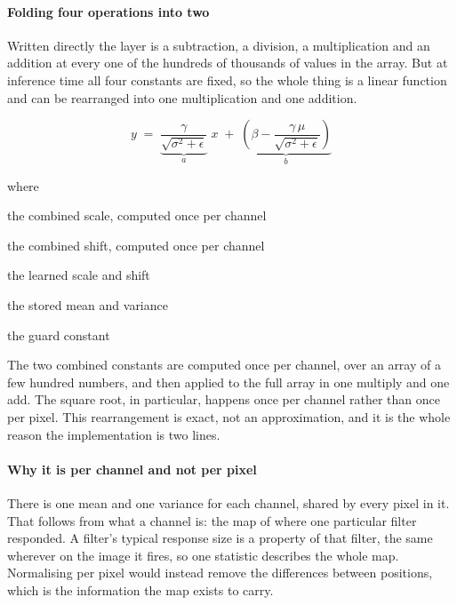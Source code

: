 \paragraph{Folding four operations into two}
Written directly the layer is a subtraction, a division, a multiplication and an addition at every one of the hundreds of thousands of values in the array. But at inference time all four constants are fixed, so the whole thing is a linear function and can be rearranged into one multiplication and one addition.


\begin{equation}
y \;=\; \underbrace{\frac{\gamma}{\sqrt{\sigma^{2}+\epsilon}}}_{\textstyle a} \; x \;+\; \underbrace{\left(\beta - \frac{\gamma\,\mu}{\sqrt{\sigma^{2}+\epsilon}}\right)}_{\textstyle b}
\end{equation}

\noindent where
\begin{description}[leftmargin=2.4em,style=nextline,font=\normalfont\ttfamily]\setlength\itemsep{1pt}
  \item[{$a$}] \normalfont the combined scale, computed once per channel
  \item[{$b$}] \normalfont the combined shift, computed once per channel
  \item[{$\gamma,\,\beta$}] \normalfont the learned scale and shift
  \item[{$\mu,\,\sigma^{2}$}] \normalfont the stored mean and variance
  \item[{$\epsilon$}] \normalfont the guard constant
\end{description}
The two combined constants are computed once per channel, over an array of a few hundred numbers, and then applied to the full array in one multiply and one add. The square root, in particular, happens once per channel rather than once per pixel. This rearrangement is exact, not an approximation, and it is the whole reason the implementation is two lines.


\paragraph{Why it is per channel and not per pixel}
There is one mean and one variance for each channel, shared by every pixel in it. That follows from what a channel is: the map of where one particular filter responded. A filter's typical response size is a property of that filter, the same wherever on the image it fires, so one statistic describes the whole map. Normalising per pixel would instead remove the differences between positions, which is the information the map exists to carry.


